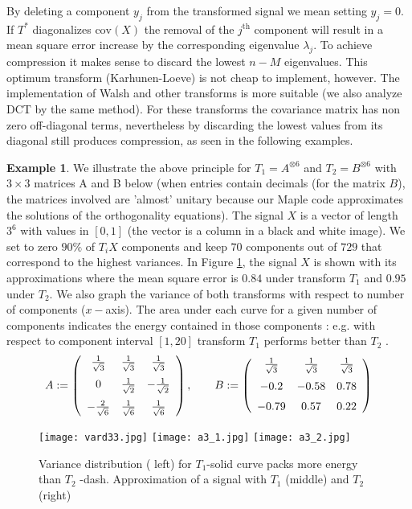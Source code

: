 \documentclass[11pt]{amsart}
\theoremstyle{definition}
\newtheorem{example}[theorem]{Example}
\theoremstyle{remark}
\numberwithin{equation}{section}
\begin{document}
By deleting a component $y_j$ from the transformed signal we mean setting $y_j=0$. If $T^*$ diagonalizes $\text{cov}(X)$  the removal of the $j^{\text{th}}$ component will result in a mean square error increase by the  corresponding eigenvalue $\lambda_j$. To achieve compression it makes sense to discard the lowest $n-M$ eigenvalues. This optimum transform (Karhunen-Loeve) is not cheap to implement, however. The implementation of Walsh and other transforms is more suitable (we also  analyze  DCT by the same method). For these transforms the covariance matrix has non zero off-diagonal terms, nevertheless by discarding the lowest values from its diagonal  still produces compression, as seen in the following examples.
\begin{example}
We illustrate the above principle for $T_1=A^{\otimes 6}$ and $T_2=B^{\otimes 6}$ with $3\times 3$ matrices A and B below (when entries contain decimals (for the matrix $B$), the matrices involved are 'almost' unitary because our Maple code approximates the solutions of the orthogonality equations). The signal $X$ is a vector of length $3^6$ with values in $[0,1]$ (the vector is a column in a black and white  image). We set to zero  $90\%$  of  $T_iX$ components and  keep $70$ components out of $729$ that correspond to the highest variances.  In Figure \ref{warp33}, the signal $X$ is shown with its approximations where the  mean square  error is $0.84$ under transform $T_1$ and $0.95$ under $T_2$. We also graph the variance of both transforms with respect to number of components ($x-$axis). The area under each curve for a given number of components indicates the energy contained in those components : e.g. with respect to component interval $[1,20]$ transform $T_1$ performs better than $T_2$ .  
\begin{equation}\label{3by3}
A:=\left( \begin {array}{ccc} \frac{1}{\sqrt{3}}&\frac{1}{\sqrt{3}}&\frac{1}{\sqrt{3}}\\
\noalign{\medskip} 0 & \frac{1}{\sqrt{2}}&  -\frac{1}{\sqrt{2}}\\
 \noalign{\medskip}   -\frac{2}{\sqrt{6}} & \frac{1}{\sqrt{6}} & \frac{1}{\sqrt{6}}
\end {array} \right),\quad\quad
B:=\left( \begin {array}{ccc}  \frac{1}{\sqrt{3}}&\frac{1}{\sqrt{3}}&\frac{1}{\sqrt{3}} \\
\noalign{\medskip}- 0.2&- 0.58& 0.78
\\ \noalign{\medskip}- 0.79& 0.57& 0.22
\end {array} \right)
\end{equation}

\begin{figure}

    \texttt{[image: vard33.jpg]}
		\texttt{[image: a3\_1.jpg]}
    \texttt{[image: a3\_2.jpg]}
\caption{Variance distribution ( left) for $T_1$-solid curve packs more energy than $T_2$ -dash. Approximation of a signal with $T_1$ (middle) and $T_2$(right)}
\label{warp33}
\end{figure}
\end{example}
\end{document}

